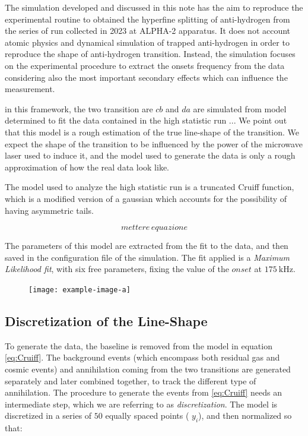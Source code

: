\documentclass[11pt,a4paper,oneside]{article}
\begin{document}
The simulation developed and discussed in this note has the aim to reproduce the experimental routine to obtained the hyperfine splitting of anti-hydrogen from the series of run collected in 2023 at ALPHA-2 apparatus. It does not account atomic physics and dynamical simulation of trapped anti-hydrogen in order to reproduce the shape of anti-hydrogen transition. Instead, the simulation focuses on the experimental procedure to extract the onsets frequency from the data considering also the most important secondary effects which can influence the measurement.

in this framework, the two transition are $cb$ and $da$ are simulated from model determined to fit the data contained in the high statistic run ... 
We point out that this model is a rough estimation of the true line-shape of the transition. We expect the shape of the transition to be influenced by the power of the microwave laser used to induce it, and the model used to generate the data is only a rough approximation of how the real data look like.

The model used to analyze the high statistic run is a truncated Cruiff function, which is a modified version of a gaussian which accounts for the possibility of having asymmetric tails.

\begin{equation} \label{eq:Cruiff}
mettere \, equazione
\end{equation} 

The parameters of this model are extracted from the fit to the data, and then saved in the configuration file of the simulation. The fit applied is a \textit{Maximum Likelihood fit}, with six free parameters, fixing the value of the $onset$ at $\SI{175}{ \kilo \hertz}$.

\begin{figure}
\centering
\texttt{[image: example-image-a]}
\end{figure}

\subsection{Discretization of the Line-Shape}

To generate the data, the baseline is removed from the model in equation \ref{eq:Cruiff}. The background events (which encompass both residual gas and cosmic events) and annihilation coming from the two transitions are generated separately and later combined together, to track the different type of annihilation. The procedure to generate the events from \ref{eq:Cruiff} needs an intermediate step, which we are referring to as \textit{discretization}. The model is discretized in a series of $50$ equally spaced points ( $y_{i}$), and then normalized so that: 
\end{document}
